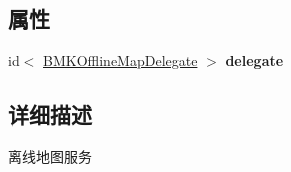 \subsection*{属性}
\begin{DoxyCompactItemize}
\item 
\hypertarget{interface_b_m_k_offline_map_ae25b1af7e710b8dbffd88aad3e081f48}{id$<$ \hyperlink{protocol_b_m_k_offline_map_delegate-p}{B\+M\+K\+Offline\+Map\+Delegate} $>$ {\bfseries delegate}}\label{interface_b_m_k_offline_map_ae25b1af7e710b8dbffd88aad3e081f48}

\end{DoxyCompactItemize}


\subsection{详细描述}
离线地图服务 

